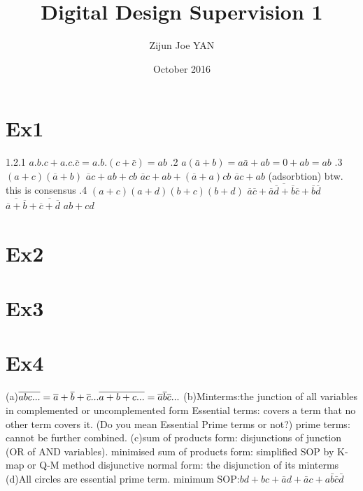 \documentclass{article}
\title{Digital Design Supervision 1}
\author{Zijun Joe YAN }
\date{October 2016}
\begin{document}
\maketitle

\section{Ex1}

1.2.1 $a.b.c+a.c.\overline{c}=a.b.(c+\bar{c})=ab$ .2 $a(\bar{a}+b)=a\bar{a}+ab=0+ab=ab$ .3 $(a+c)(\overline{a}+b)$ \newline
	  $\overline{a}c+ab+cb$	\newline
	  $\overline{a}c+ab+(\overline{a}+a)cb$\newline 
	  $\overline{a}c+ab$ (adsorbtion) btw. this is consensus .4 $(a+c)(a+d)(b+c)(b+d)$ \newline
	  $\overline{\overline{a}\overline{c}+\overline{a}\overline{d}+\overline{b}\overline{c}+\overline{b}\overline{d}}$ \newline
	  $\overline{\overline{a}+\overline{b}}+\overline{\overline{c}+\overline{d}}$\newline
	  $ab+cd$
\section{Ex2}

\section{Ex3}

\section{Ex4}
(a)$\overline{abc...}=\overline{a}+\overline{b}+\overline{c}...\newline
\overline{a+b+c...}=\overline{a}\overline{b}\overline{c}...
$\newline
(b)Minterms:the junction of all variables in complemented or uncomplemented form\newline
   Essential terms: covers a term that no other term covers it. (Do you mean Essential Prime terms or not?)\newline
   prime terms: cannot be further combined.\newline
(c)sum of products form: disjunctions of junction (OR of AND variables).\newline
   minimised sum of products form: simplified SOP by K-map or  Q-M method\newline
   disjunctive normal form: the disjunction of its minterms\newline
(d)All circles are essential prime term.\newline
   minimum SOP:$bd+bc+\bar{a}d+\bar{a}c+a\bar{b}\bar{c}\bar{d}$
\end{document}
